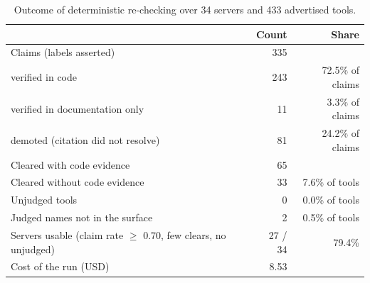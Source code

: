 \documentclass[acmsmall,screen,review,anonymous]{acmart}
\begin{document}
\begin{table}[t]
\caption{Outcome of deterministic re-checking over 34 servers and 433 advertised tools.}
\label{tab:summarize}
\begin{tabular}{lrr}
\toprule
 & Count & Share \\
\midrule
Claims (labels asserted) & 335 & \\
\quad verified in code & 243 & 72.5\% of claims \\
\quad verified in documentation only & 11 & 3.3\% of claims \\
\quad demoted (citation did not resolve) & 81 & 24.2\% of claims \\
Cleared with code evidence & 65 & \\
Cleared without code evidence & 33 & 7.6\% of tools \\
Unjudged tools & 0 & 0.0\% of tools \\
Judged names not in the surface & 2 & 0.5\% of tools \\
\midrule
Servers usable (claim rate $\geq$ 0.70, few clears, no unjudged) & 27 / 34 & 79.4\% \\
Cost of the run (USD) & 8.53 & \\
\bottomrule
\end{tabular}
\end{table}
\end{document}
